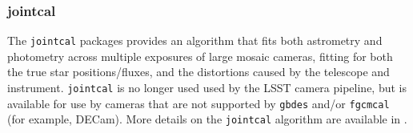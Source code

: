 \subsubsection{jointcal}
\label{sec:jointcal}

The \texttt{jointcal} packages provides an algorithm that fits both astrometry and photometry across multiple exposures of large mosaic cameras, fitting for both the true star positions/fluxes, and the distortions caused by the telescope and instrument.
\texttt{jointcal} is no longer used used by the LSST camera pipeline, but is available for use by cameras that are not supported by \texttt{gbdes} and/or \texttt{fgcmcal} (for example, DECam).
More details on the \texttt{jointcal} algorithm are available in \citet{DMTN-036}.
